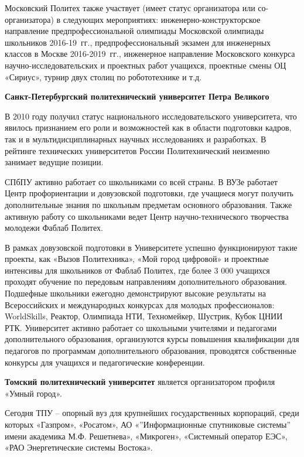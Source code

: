 Московский Политех также участвует (имеет статус организатора или со-\linebreak организатора) в следующих мероприятиях: инженерно-конструкторское направление предпрофессиональной олимпиады Московской олимпиады школьников 2016-19~гг., предпрофессиональный экзамен для инженерных классов в Москве 2016-2019~гг., инженерное направление Московского конкурса научно-исследовательских и проектных работ учащихся, проектные смены ОЦ «Сириус», турнир двух столиц по робототехнике и т.д.

\textbf{Санкт-Петербургский политехнический университет Петра Великого}

В 2010 году получил статус национального исследовательского университета, что явилось признанием его роли и возможностей как в области подготовки кадров, так и в мультидисциплинарных научных исследованиях и разработках. В рейтинге технических университетов России Политехнический неизменно занимает ведущие позиции.

СПбПУ активно работает со школьниками со всей страны. В ВУЗе работает Центр профориентации и довузовской подготовки, где учащиеся могут получить дополнительные знания по школьным предметам основного образования. Также активную работу со школьниками ведет Центр научно-технического творчества молодежи Фаблаб Политех.

В рамках довузовской подготовки в Университете успешно функционируют такие проекты, как «Вызов Политехника», «Мой город цифровой» и проектные интенсивы для школьников от Фаблаб Политех, где более 3 000 учащихся проходят обучение по передовым направлениям дополнительного образования. Подшефные школьники ежегодно демонстрируют высокие результаты на Всероссийских и международных конкурсах для молодых профессионалов: WorldSkills, Реактор, Олимпиада НТИ, Техномейкер, Шустрик, Кубок ЦНИИ РТК. Университет активно работает со школьными учителями и педагогами дополнительного образования, организуются курсы повышения квалификации для педагогов по программам дополнительного образования, проводятся собственные конкурсы для учащихся и педагогические конференции.

\textbf{Томский политехнический университет} является организатором профиля «Умный город».

Сегодня ТПУ – опорный вуз для крупнейших государственных корпораций, среди которых «Газпром», «Росатом», АО «”Информационные спутниковые системы” имени академика М.Ф. Решетнева», «Микроген», «Системный оператор ЕЭС», «РАО Энергетические системы Востока».

